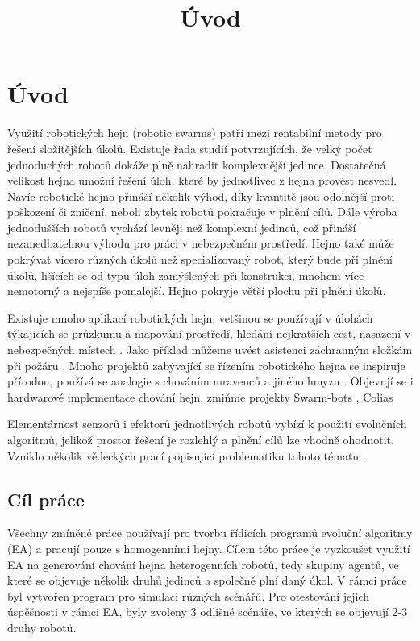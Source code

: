 \chapter*{Úvod}

\title{Úvod}
Využití robotických hejn (robotic swarms) patří mezi rentabilní metody pro řešení složitějších úkolů. Existuje řada studií potvrzujících, že velký počet jednoduchých robotů dokáže plně nahradit komplexnější jedince. Dostatečná velikost hejna umožní řešení úloh, které by jednotlivec z hejna provést nesvedl. Navíc robotické hejno přináší několik výhod, díky kvantitě jsou odolnější proti poškození či zničení, neboli zbytek robotů pokračuje v plnění cílů. Dále výroba jednodušších robotů vychází levněji než komplexní jedinců, což přináší nezanedbatelnou výhodu pro práci v nebezpečném prostředí. Hejno také může pokrývat vícero různých úkolů než specializovaný robot, který bude při plnění úkolů, lišících se od typu úloh zamýšlených při konstrukci, mnohem více nemotorný a nejspíše pomalejší. Hejno pokryje větší plochu při plnění úkolů. 
\par
Existuje mnoho aplikací robotických hejn, vetšinou se používají v úlohách týkajících se průzkumu a mapování prostředí, hledání nejkratších cest, nasazení v nebezpečných místech \citep{swarmApp}. Jako příklad můžeme uvést asistenci záchranným složkám při požáru \citep{fireRobots}. Mnoho projektů zabývající se řízením robotického hejna se inspiruje přírodou, používá se analogie s chováním mravenců a jiného hmyzu \citep{PheroRobot}. Objevují se i hardwarové implementace chování hejn, zmiňme projekty Swarm-bots \citep{swarmBots}, Colias \citep{Colias}  
\par 
Elementárnost senzorů i efektorů jednotlivých robotů vybízí k použití evolučních algoritmů, jelikož prostor řešení je rozlehlý a plnění cílů lze vhodně ohodnotit. Vzniklo několik vědeckých prací popisující problematiku tohoto tématu \citep{ENovel} \citep{geneticSwarm}.
\section*{Cíl práce}
Všechny zmíněné práce používají pro tvorbu řídicích programů evoluční algoritmy (EA) a pracují pouze s homogenními hejny. Cílem této práce je vyzkoušet využití EA na generování chování hejna heterogenních robotů, tedy skupiny agentů, ve které se objevuje několik druhů jedinců a společně plní daný úkol. V rámci práce byl vytvořen program pro simulaci různých scénářů. Pro otestování jejich úspěšnosti v rámci EA, byly zvoleny 3 odlišné scénáře, ve kterých se objevují 2-3 druhy robotů.

